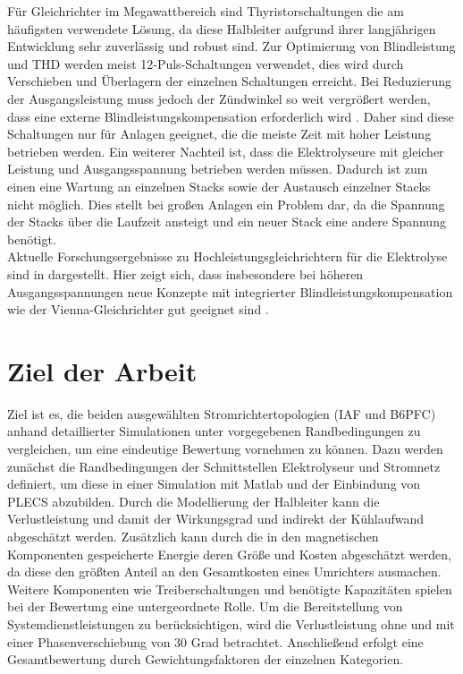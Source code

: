 Für Gleichrichter im Megawattbereich sind Thyristorschaltungen die am häufigsten verwendete Lösung, da diese Halbleiter aufgrund ihrer langjährigen Entwicklung sehr zuverlässig und robust sind. Zur Optimierung von Blindleistung und \gls{THD} werden meist 12-Puls-Schaltungen verwendet, dies wird durch Verschieben und Überlagern der einzelnen Schaltungen erreicht. Bei Reduzierung der Ausgangsleistung muss jedoch der Zündwinkel so weit vergrößert werden, dass eine externe Blindleistungskompensation erforderlich wird \cite{HydrogenElectronicTopologies}. Daher sind diese Schaltungen nur für Anlagen geeignet, die die meiste Zeit mit hoher Leistung betrieben werden. Ein weiterer Nachteil ist, dass die Elektrolyseure mit gleicher Leistung und Ausgangsspannung betrieben werden müssen. Dadurch ist zum einen eine Wartung an einzelnen Stacks sowie der Austausch einzelner Stacks nicht möglich. Dies stellt bei großen Anlagen ein Problem dar, da die Spannung der Stacks über die Laufzeit ansteigt und ein neuer Stack eine andere Spannung benötigt.\\
Aktuelle Forschungsergebnisse zu Hochleistungsgleichrichtern für die Elektrolyse sind in \cite{HydrogenRectifier} dargestellt. Hier zeigt sich, dass insbesondere bei höheren Ausgangsspannungen neue Konzepte mit integrierter Blindleistungskompensation wie der Vienna-Gleichrichter gut geeignet sind \cite{HydrogenRectifier}.
\section{Ziel der Arbeit}
Ziel ist es, die beiden ausgewählten Stromrichtertopologien (\gls{IAF} und \gls{B6PFC}) anhand detaillierter Simulationen unter vorgegebenen Randbedingungen zu vergleichen, um eine eindeutige Bewertung vornehmen zu können. Dazu werden zunächst die Randbedingungen der Schnittstellen Elektrolyseur und Stromnetz definiert, um diese in einer Simulation mit Matlab und der Einbindung von PLECS abzubilden. Durch die Modellierung der Halbleiter kann die Verlustleistung und damit der Wirkungsgrad und indirekt der Kühlaufwand abgeschätzt werden. Zusätzlich kann durch die in den magnetischen Komponenten gespeicherte Energie deren Größe und Kosten abgeschätzt werden, da diese den größten Anteil an den Gesamtkosten eines Umrichters ausmachen. Weitere Komponenten wie Treiberschaltungen und benötigte Kapazitäten spielen bei der Bewertung eine untergeordnete Rolle. Um die Bereitstellung von Systemdienstleistungen zu berücksichtigen, wird die Verlustleistung ohne und mit einer Phasenverschiebung von 30 Grad betrachtet. Anschließend erfolgt eine Gesamtbewertung durch Gewichtungsfaktoren der einzelnen Kategorien.